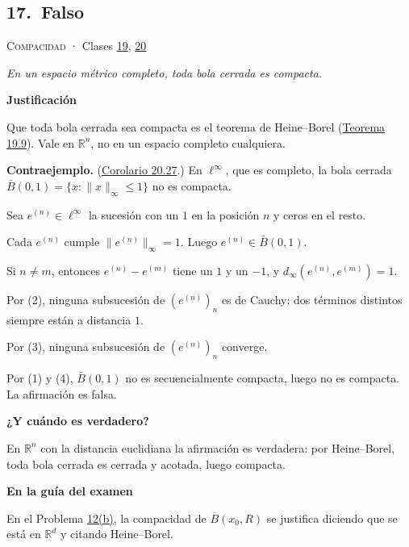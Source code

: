 \documentclass[11pt,a4paper]{article}
\newcommand{\R}{\mathbb{R}}\newcommand{\N}{\mathbb{N}}\newcommand{\Q}{\mathbb{Q}}
\newcommand{\cl}[1]{\overline{#1}}\newcommand{\norm}[1]{\lVert #1\rVert}\newcommand{\abs}[1]{\lvert #1\rvert}
\newcommand{\bloque}[1]{\par\smallskip\noindent\textbf{\color{acento}#1}\par}
\begin{document}
\subsection*{\hypertarget{r-17}{}17.\ \textcolor{bad}{Falso}}
{\small \textsc{Compacidad} · Clases \href{https://decostruttivismo.github.io/MAT2514-repaso/pdf/MAT2514_apuntes_completos.pdf\#nameddest=section.19}{19}, \href{https://decostruttivismo.github.io/MAT2514-repaso/pdf/MAT2514_apuntes_completos.pdf\#nameddest=section.20}{20}}\par
\emph{En un espacio métrico completo, toda bola cerrada es compacta.}
\bloque{Justificación}
\begin{pasos}
\item[] Que toda bola cerrada sea compacta es el teorema de Heine–Borel (\href{https://decostruttivismo.github.io/MAT2514-repaso/pdf/MAT2514_apuntes_completos.pdf\#nameddest=teorema.19.9}{Teorema 19.9}). Vale en $\R^n$, no en un espacio completo cualquiera.
\item[] \textbf{Contraejemplo.} (\href{https://decostruttivismo.github.io/MAT2514-repaso/pdf/MAT2514_apuntes_completos.pdf\#nameddest=teorema.20.27}{Corolario 20.27}.) En $\ell^\infty$, que es completo, la bola cerrada $\bar B(0,1)=\{x:\norm x_\infty\le1\}$ no es compacta.
\item[] Sea $e^{(n)}\in\ell^\infty$ la sucesión con un $1$ en la posición $n$ y ceros en el resto.
\item[(1)] Cada $e^{(n)}$ cumple $\norm{e^{(n)}}_\infty=1$. Luego $e^{(n)}\in\bar B(0,1)$.
\item[(2)] Si $n\ne m$, entonces $e^{(n)}-e^{(m)}$ tiene un $1$ y un $-1$, y $d_\infty(e^{(n)},e^{(m)})=1$.
\item[(3)] Por (2), ninguna subsucesión de $(e^{(n)})_n$ es de Cauchy: dos términos distintos siempre están a distancia $1$.
\item[(4)] Por (3), ninguna subsucesión de $(e^{(n)})_n$ converge.
\item[] Por (1) y (4), $\bar B(0,1)$ no es secuencialmente compacta, luego no es compacta. La afirmación es falsa.
\end{pasos}
\bloque{¿Y cuándo es verdadero?}
\begin{pasos}
\item[] En $\R^n$ con la distancia euclidiana la afirmación es verdadera: por Heine–Borel, toda bola cerrada es cerrada y acotada, luego compacta.
\end{pasos}
\bloque{En la guía del examen}
\begin{pasos}
\item[] En el Problema \hyperlink{prob-12}{12(b)}, la compacidad de $\cl B(x_0,R)$ se justifica diciendo que se está en $\R^d$ y citando Heine–Borel.
\end{pasos}
\end{document}
